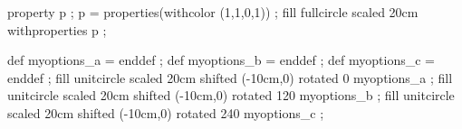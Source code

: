 \definecolor[tcolor_a][c=1,a=1,t=0.6]
\definecolor[tcolor_b][m=1,a=1,t=0.6]
\definecolor[tcolor_c][y=1,a=1,t=0.6]

\startMPpage
    property p ; p = properties(withcolor (1,1,0,1)) ;
    fill fullcircle scaled 20cm withproperties p ;

    def myoptions_a =  enddef ;
    def myoptions_b =  enddef ;
    def myoptions_c =  enddef ;
    fill unitcircle scaled 20cm shifted (-10cm,0) rotated   0 myoptions_a ;
    fill unitcircle scaled 20cm shifted (-10cm,0) rotated 120 myoptions_b ;
    fill unitcircle scaled 20cm shifted (-10cm,0) rotated 240 myoptions_c ;
\stopMPpage

